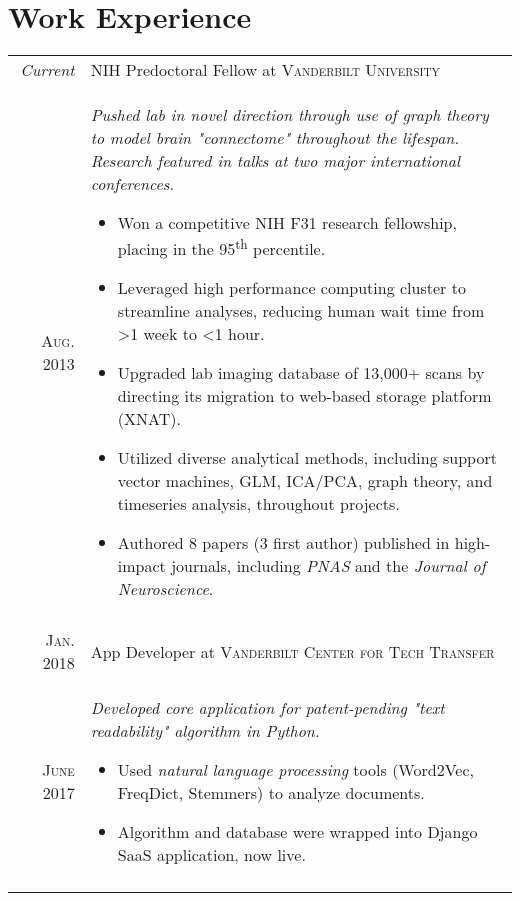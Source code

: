 \documentclass[a4paper,10pt]{article}
\begin{document}
\section{Work Experience}
\begin{longtable}{r|p{11cm}}
 	\emph{Current} & NIH Predoctoral Fellow at \textsc{Vanderbilt University} \\*
 	\textsc{Aug. 2013} & \emph{Pushed lab in novel direction  through use of graph theory to model brain "connectome" throughout the lifespan. Research featured in talks at two major international conferences. } 	\href{https://ww5.aievolution.com/hbm1801/index.cfm?do=ev.viewEv&ev=1362}{\color{blue}\Mundus} \footnotesize{
 	\begin{itemize}[itemsep=1pt,topsep=2pt]
    	\item Won a competitive NIH F31 research fellowship, placing in the 95\textsuperscript{th} percentile. \href{https://projectreporter.nih.gov/project_info_description.cfm?aid=9328269&icde=35806628}{\color{blue}\Mundus}
    	\item Leveraged high performance computing cluster to streamline analyses, reducing human wait time from \textgreater 1 week to \textless 1 hour.
    	\item Upgraded lab imaging database of 13,000+ scans by directing its migration to web-based storage platform (XNAT).
    	\item Utilized diverse analytical methods, including support vector machines, GLM, ICA/PCA, graph theory, and timeseries analysis, throughout projects.
    	\item Authored 8 papers (3 first author) published in high-impact journals,  including  \textit{PNAS} and the  \textit{Journal of Neuroscience}. \href{https://scholar.google.com/citations?user=s3nPF1MAAAAJ&hl=en}{\color{blue}\Mundus}
	\end{itemize} } \\*
	\\
    
    
	\textsc{Jan.} 2018 & App Developer at \textsc{Vanderbilt Center for Tech Transfer} \\*
	\textsc{June} 2017&\emph{Developed core application for patent-pending "text readability" algorithm in Python.}
	\footnotesize{
	\begin{itemize}[itemsep=1pt,topsep=2pt]
	    \item Used \textit{natural language processing} tools (Word2Vec, FreqDict, Stemmers) to analyze documents.
	    \item Algorithm and database were wrapped into Django SaaS application, now live.
    \end{itemize}}\\*
 	 \\


\end{longtable}
\end{document}
